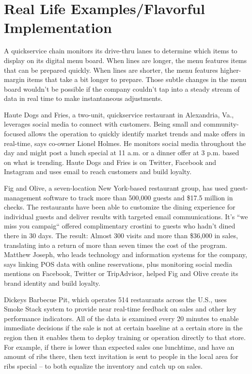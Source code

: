 \documentclass[sigconf]{acmart}
\begin{document}
\section{Real Life Examples/Flavorful Implementation}
A quickservice chain monitors its drive-thru lanes to determine which items to display on its digital menu board. When lines are longer, the menu features items that can be prepared quickly. When lines are shorter, the menu features higher-margin items that take a bit longer to prepare. Those subtle changes in the menu board wouldn’t be possible if the company couldn’t tap into a steady stream of data in real time to make instantaneous adjustments.\cite{www-restaurant}


Haute Dogs and Fries, a two-unit, quickservice restaurant in Alexandria, Va., leverages social media to connect with customers. Being small and community-focused allows the operation to quickly identify market trends and make offers in real-time, says co-owner Lionel Holmes. He monitors social media throughout the day and might post a lunch special at 11 a.m. or a dinner offer at 3 p.m. based on what is trending. Haute Dogs and Fries is on Twitter, Facebook and Instagram and uses email to reach customers and build loyalty.\cite{www-restaurant}


Fig and Olive, a seven-location New York-based restaurant group, has used guest-management software to track more than 500,000 guests and \$17.5 million in checks. The restaurants have been able to customize the dining experience for individual guests and deliver results with targeted email communications. It's ``we miss you campaig`` offered complimentary crostini to guests who hadn't dined there in 30 days. The result: Almost 300 visits and more than \$36,000 in sales, translating into a return of more than seven times the cost of the program. Matthew Joseph, who leads technology and information systems for the company, says linking POS data with online reservations, plus monitoring social media mentions on Facebook, Twitter or TripAdvisor, helped Fig and Olive create its brand identity and build loyalty.\cite{www-restaurant}


 Dickeys Barbecue Pit, which operates 514 restaurants across the U.S., uses Smoke Stack system to provide near real-time feedback on sales and other key performance indicators. All of the data is examined every 20 minutes to enable immediate decisions if the sale is not at certain baseline at a certain store in the region then it enables them to deploy training or operation directly to that store. For example, if there is lower than expected sales one lunchtime, and have an amount of ribs there, then text invitation is sent to people in the local area for ribs special – to both equalize the inventory and catch up on sales.\cite{www-forbes}
\end{document}
